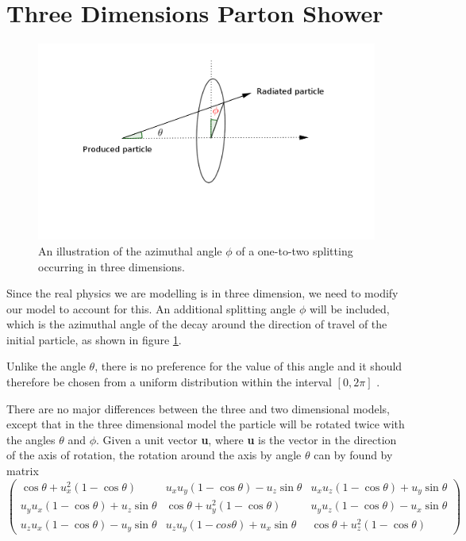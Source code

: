 \section{Three Dimensions Parton Shower}

\begin{figure}[hbtp]
\centering
\includegraphics[scale=.5]{images/three-dimentions.png}
\caption{An illustration of the azimuthal angle $\phi$ of a one-to-two splitting occurring in three dimensions.}\label{fig:3d}
\end{figure}
Since the real physics we are modelling is in three dimension, we need to modify our model to account for this. An additional splitting angle $\phi$ will be included, which is the azimuthal angle of the decay  around the direction of travel of the initial particle, as shown in figure \ref{fig:3d}.

Unlike the angle $\theta$, there is no preference for the value of this angle and it should therefore be chosen from a uniform distribution within the interval $[0,2\pi]$ \citep{Salam:2010zt}.

There are no major differences between the three and two dimensional models, except that in the three dimensional model the particle will be rotated twice with the angles $\theta$ and $\phi$. Given a unit vector \textbf{u}, where \textbf{u} is the vector
in the direction of the axis of rotation,  the rotation around the axis by angle $\theta$ can by found by matrix       
\begin{equation} 
\begin{pmatrix}
\cos\theta + u^2_x(1-\cos\theta) & u_x u_y (1-\cos\theta) - u_z \sin\theta& u_x u_z(1-\cos\theta)+ u_y \sin\theta\\

u_y u_x (1 - \cos\theta) + u_z \sin\theta & \cos\theta + u_y^2 (1 - \cos\theta) & u_y u_z (1 - \cos\theta) - u_x \sin\theta \\

u_z u_x (1 - \cos\theta) - u_y \sin\theta & u_z u_y (1 - cos\theta) + u_x \sin\theta & \cos\theta + u_z^2 (1 - \cos\theta)
\end{pmatrix}
\end{equation}

